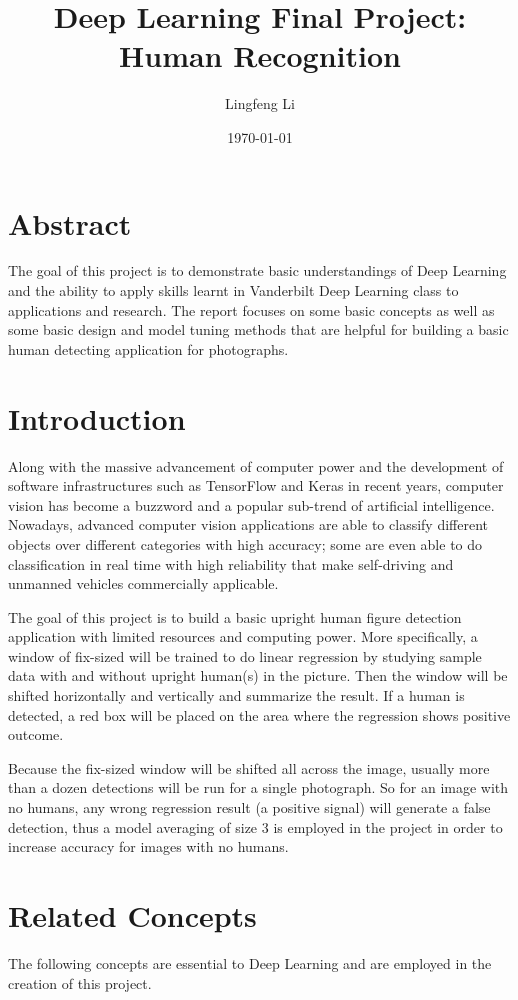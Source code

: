 \documentclass[twocolumn, 12pt]{article}
\begin{document}
\title{Deep Learning Final Project: Human Recognition}
\author{Lingfeng Li}
\date{\today}
\maketitle
\newpage
{}
\section*{Abstract}
The goal of this project is to demonstrate basic understandings of Deep Learning and the ability to apply skills learnt in Vanderbilt Deep Learning class to applications and research. The report focuses on some basic concepts as well as some basic design and model tuning methods that are helpful for building a basic human detecting application for photographs. 
	
\section{Introduction}
Along with the massive advancement of computer power and the development of software infrastructures such as TensorFlow and Keras in recent years, computer vision has become a buzzword and a popular sub-trend of artificial intelligence. Nowadays, advanced computer vision applications are able to classify different objects over different categories with high accuracy; some are even able to do classification in real time with high reliability that make self-driving and unmanned vehicles commercially applicable. 

The goal of this project is to build a basic upright human figure detection application with limited resources and computing power. More specifically, a window of fix-sized will be trained to do linear regression by studying sample data with and without upright human(s) in the picture. Then the window will be shifted horizontally and vertically and summarize the result. If a human is detected, a red box will be placed on the area where the regression shows positive outcome. 

Because the fix-sized window will be shifted all across the image, usually more than a dozen detections will be run for a single photograph. So for an image with no humans, any wrong regression result (a positive signal) will generate a false detection, thus a model averaging of size 3 is employed in the project in order to increase accuracy for images with no humans. 

\section{Related Concepts}
The following concepts are essential to Deep Learning and are employed in the creation of this project.
\end{document}
